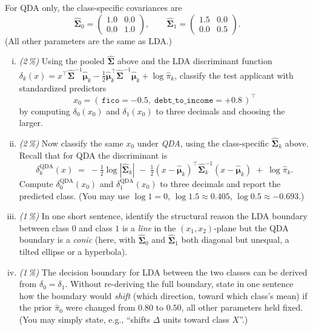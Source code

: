 \documentclass[11pt,a4paper]{article}
\newcommand{\subpoints}[1]{\textit{(#1\,\%)}}
\begin{document}
For QDA only, the class-specific covariances are
$$\hat{\bm\Sigma}_0 = \begin{pmatrix} 1.0 & 0.0 \\ 0.0 & 1.0 \end{pmatrix}, \qquad \hat{\bm\Sigma}_1 = \begin{pmatrix} 1.5 & 0.0 \\ 0.0 & 0.5 \end{pmatrix}.$$
(All other parameters are the same as LDA.)

\begin{enumerate}[(i)]
  \item \subpoints{2} Using the pooled $\hat{\bm\Sigma}$ above and the LDA discriminant function $\delta_k(x) = x^\top \hat{\bm\Sigma}^{-1}\hat{\bm\mu}_k - \tfrac{1}{2}\hat{\bm\mu}_k^\top \hat{\bm\Sigma}^{-1} \hat{\bm\mu}_k + \log\hat\pi_k$, classify the test applicant with standardized predictors
  $$x_0 = (\,\texttt{fico} = -0.5,\; \texttt{debt\_to\_income} = +0.8\,)^\top$$
  by computing $\delta_0(x_0)$ and $\delta_1(x_0)$ to three decimals and choosing the larger.

  \item \subpoints{2} Now classify the same $x_0$ under \emph{QDA}, using the class-specific $\hat{\bm\Sigma}_k$ above. Recall that for QDA the discriminant is
  $$\delta_k^{\text{QDA}}(x) \;=\; -\tfrac{1}{2}\log\!|\hat{\bm\Sigma}_k| \;-\; \tfrac{1}{2}(x - \hat{\bm\mu}_k)^\top \hat{\bm\Sigma}_k^{-1} (x - \hat{\bm\mu}_k) \;+\; \log\hat\pi_k.$$
  Compute $\delta_0^{\text{QDA}}(x_0)$ and $\delta_1^{\text{QDA}}(x_0)$ to three decimals and report the predicted class. (You may use $\log 1 = 0$, $\log 1.5 \approx 0.405$, $\log 0.5 \approx -0.693$.)

  \item \subpoints{1} In one short sentence, identify the structural reason the LDA boundary between class $0$ and class $1$ is a \emph{line} in the $(x_1, x_2)$-plane but the QDA boundary is a \emph{conic} (here, with $\hat{\bm\Sigma}_0$ and $\hat{\bm\Sigma}_1$ both diagonal but unequal, a tilted ellipse or a hyperbola).

  \item \subpoints{1} The decision boundary for LDA between the two classes can be derived from $\delta_0 = \delta_1$. Without re-deriving the full boundary, state in one sentence how the boundary would \emph{shift} (which direction, toward which class's mean) if the prior $\hat\pi_0$ were changed from $0.80$ to $0.50$, all other parameters held fixed. (You may simply state, e.g., ``shifts $\Delta$ units toward class $X$''.)
\end{enumerate}
\end{document}
